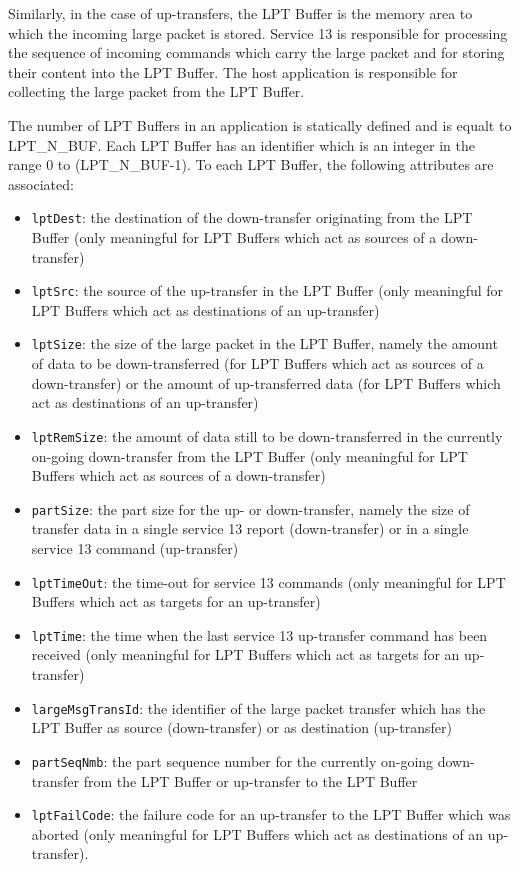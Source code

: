 \documentclass{pnp_article}
\begin{document}
Similarly, in the case of up-transfers, the LPT Buffer is the memory area to which the incoming large packet is stored. Service 13 is responsible for processing the sequence of incoming commands which carry the large packet and for storing their content into the LPT Buffer. The host application is responsible for collecting the large packet from the LPT Buffer.

The  number of LPT Buffers in an application is statically defined and is equalt to LPT\_N\_BUF. Each LPT Buffer has an identifier which is an integer in the range 0 to (LPT\_N\_BUF-1). To each LPT Buffer, the following attributes are associated:

\begin{itemize}
\item \texttt{lptDest}: the destination of the down-transfer originating from the LPT Buffer (only meaningful for LPT Buffers which act as sources of a down-transfer)
\item \texttt{lptSrc}: the source of the up-transfer in the LPT Buffer (only meaningful for LPT Buffers which act as destinations of an up-transfer)
\item \texttt{lptSize}: the size of the large packet in the LPT Buffer, namely the amount of data to be down-transferred (for LPT Buffers which act as sources of a down-transfer) or the amount of up-transferred data (for LPT Buffers which act as destinations of an up-transfer)
\item \texttt{lptRemSize}: the amount of data still to be down-transferred in the currently on-going down-transfer from the LPT Buffer (only meaningful for LPT Buffers which act as sources of a down-transfer)
\item \texttt{partSize}: the part size for the up- or down-transfer, namely the size of transfer data in a single service 13 report (down-transfer) or in a single service 13 command (up-transfer)
\item \texttt{lptTimeOut}: the time-out for service 13 commands (only meaningful for LPT Buffers which act as targets for an up-transfer) 
\item \texttt{lptTime}: the time when the last service 13 up-transfer command has been received (only meaningful for LPT Buffers which act as targets for an up-transfer) 
\item \texttt{largeMsgTransId}: the identifier of the large packet transfer which has the LPT Buffer as source (down-transfer) or as destination (up-transfer)
\item \texttt{partSeqNmb}: the part sequence number for the currently on-going down-transfer from the LPT Buffer or up-transfer to the LPT Buffer
\item \texttt{lptFailCode}: the failure code for an up-transfer to the LPT Buffer which was aborted (only meaningful for LPT Buffers which act as destinations of an up-transfer). 
\end{itemize}
\end{document}
